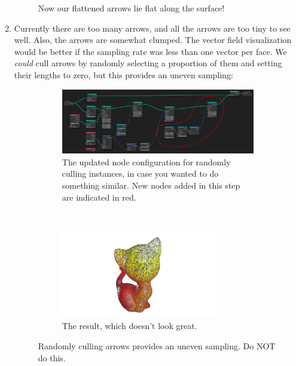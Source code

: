 \documentclass[10pt]{article}
\begin{document}
\begin{enumerate}
\begin{figure}[H]
        \caption{Now our flattened arrows lie flat along the surface!}
        \label{fig:vector_instance_adhering}
    \end{figure}
    \item Currently there are too many arrows, and all the arrows are too tiny to see well. Also, the arrows are somewhat clumped. The vector field visualization would be better if the sampling rate was less than one vector per face. We \emph{could} cull arrows by randomly selecting a proportion of them and setting their lengths to zero, but this provides an uneven sampling:
    \begin{figure}[H]
        \centering
        \captionsetup{width=0.8\textwidth}
        \begin{subfigure}[b]{\textwidth}
         \centering
         \includegraphics[width=\textwidth]{images/vector_instance_random-cull_nodes.png}
         \caption{The updated node configuration for randomly culling instances, in case you wanted to do something similar. New nodes added in this step are indicated in red.}
        \end{subfigure} \\
        \begin{subfigure}[b]{\textwidth}
         \centering
         \includegraphics[width=0.8\textwidth]{images/vector_instance_random-cull.png}
         \caption{The result, which doesn't look great.}
        \end{subfigure}
        \caption{Randomly culling arrows provides an uneven sampling. Do NOT do this.}

\end{figure}
\end{enumerate}
\end{document}
